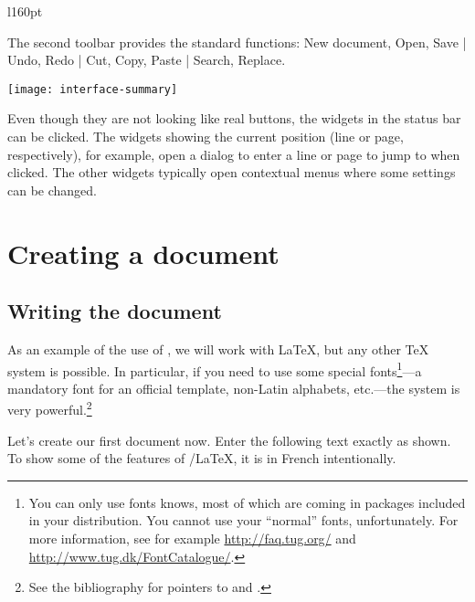 \begin{wrapfigure}[2]{l}{160pt}
\vspace*{-1em}
\usebox{\inlineimg}
\end{wrapfigure}
\noindent The second toolbar provides the standard functions: New document, Open, Save | Undo, Redo | Cut, Copy, Paste | Search, Replace.

\begin{center}
\texttt{[image: interface-summary]}
\end{center}

Even though they are not looking like real buttons, the widgets in the status bar can be clicked. The widgets showing the current position (line or page, respectively), for example, open a dialog to enter a line or page to jump to when clicked. The other widgets typically open contextual menus where some settings can be changed.

\section{Creating a document}

\subsection{Writing the document}

As an example of the use of {\Tw}, we will work with \LaTeX{}, but any other {\TeX} system is possible. In particular, if you need to use some special fonts\footnote{You can only use fonts {\AllTeX} knows, most of which are coming in packages included in your distribution. You cannot use your ``normal'' fonts, unfortunately. For more information, see for example \url{http://faq.tug.org/} and \url{http://www.tug.dk/FontCatalogue/}.}---a mandatory font for an official template, non-Latin alphabets, etc.---the {\XeTeX} system is very powerful.\footnote{See the bibliography for pointers to {\XeTeX} and \XeLaTeX.}

Let's create our first document now. Enter the following text exactly as shown. To show some of the features of {\Tw}/{\LaTeX}, it is in French intentionally.

